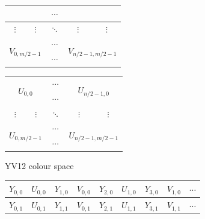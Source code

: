 \documentclass[12pt,a4paper,oneside,openright]{book}
\begin{document}
\begin{CJK}{UTF8}{}
\begin{figure}[htbp]
\begin{center}
\begin{scriptsize}
\begin{minipage}[c]{.27\textwidth}
\begin{center}
\begin{tabular}{|c|c|c|c|c|}
            \multicolumn{2}{|c|}{}    & $\cdots$ & \multicolumn{2}{|c|}{} \\\hline
            $\vdots$    & $\vdots$    & $\ddots$ & $\vdots$ & $\vdots$    \\\hline
            \multicolumn{2}{|c|}{\multirow{2}{*}{$V_{0,m/2-1}$}} & $\cdots$ & \multicolumn{2}{|c|}{\multirow{2}{*}{$V_{n/2-1,m/2-1}$}} \\\cline{3-3}
            \multicolumn{2}{|c|}{}    & $\cdots$ & \multicolumn{2}{|c|}{} \\\hline
          \end{tabular}
        \end{center}
      \end{minipage}
      \begin{minipage}[c]{.27\textwidth}
        \begin{flushleft}
          \begin{tabular}{|c|c|c|c|c|}\hline
            \multicolumn{2}{|c|}{\multirow{2}{*}{$U_{0,0}$}} & $\cdots$ & \multicolumn{2}{|c|}{\multirow{2}{*}{$U_{n/2-1,0}$}} \\\cline{3-3}
            \multicolumn{2}{|c|}{}    & $\cdots$ & \multicolumn{2}{|c|}{} \\\hline
            $\vdots$    & $\vdots$    & $\ddots$ & $\vdots$ & $\vdots$    \\\hline
            \multicolumn{2}{|c|}{\multirow{2}{*}{$U_{0,m/2-1}$}} & $\cdots$ & \multicolumn{2}{|c|}{\multirow{2}{*}{$U_{n/2-1,m/2-1}$}} \\\cline{3-3}
            \multicolumn{2}{|c|}{}    & $\cdots$ & \multicolumn{2}{|c|}{} \\\hline
          \end{tabular}
        \end{flushleft}
      \end{minipage}
    \end{scriptsize}
    \caption{YV12 colour space~\citep{fourcc}\label{fig:yv12}}
  \end{center}
\end{figure}
\begin{figure}
  \begin{center}
    \begin{small}
      \begin{tabular}{|c|c|c|c||c|c|c|c||c}\hline
        $Y_{0,0}$ & $U_{0,0}$ & $Y_{1,0}$ & $V_{0,0}$ & $Y_{2,0}$ & $U_{1,0}$ & $Y_{3,0}$ & $V_{1,0}$ & $\cdots$ \\\hline
        $Y_{0,1}$ & $U_{0,1}$ & $Y_{1,1}$ & $V_{0,1}$ & $Y_{2,1}$ & $U_{1,1}$ & $Y_{3,1}$ & $V_{1,1}$ & $\cdots$ \\\hline

\end{tabular}
\end{small}
\end{center}
\end{figure}
\end{CJK}
\end{document}
